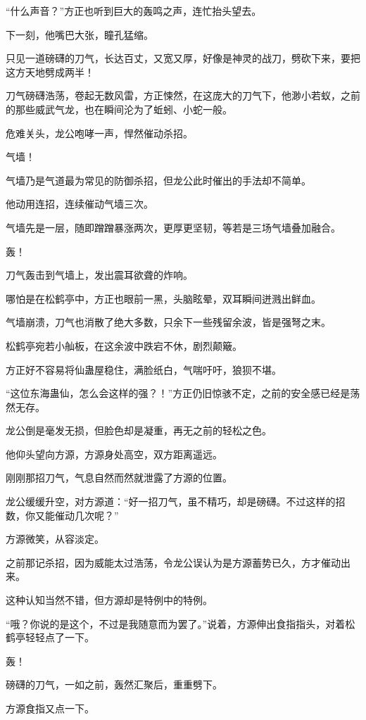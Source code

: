 \begin{this_body}
“什么声音？”方正也听到巨大的轰鸣之声，连忙抬头望去。

下一刻，他嘴巴大张，瞳孔猛缩。

只见一道磅礴的刀气，长达百丈，又宽又厚，好像是神灵的战刀，劈砍下来，要把这方天地劈成两半！

刀气磅礴浩荡，卷起无数风雷，方正悚然，在这庞大的刀气下，他渺小若蚁，之前的那些威武气龙，也在瞬间沦为了蚯蚓、小蛇一般。

危难关头，龙公咆哮一声，悍然催动杀招。

气墙！

气墙乃是气道最为常见的防御杀招，但龙公此时催出的手法却不简单。

他动用连招，连续催动气墙三次。

气墙先是一层，随即蹭蹭暴涨两次，更厚更坚韧，等若是三场气墙叠加融合。

轰！

刀气轰击到气墙上，发出震耳欲聋的炸响。

哪怕是在松鹤亭中，方正也眼前一黑，头脑眩晕，双耳瞬间迸溅出鲜血。

气墙崩溃，刀气也消散了绝大多数，只余下一些残留余波，皆是强弩之末。

松鹤亭宛若小舢板，在这余波中跌宕不休，剧烈颠簸。

方正好不容易将仙蛊屋稳住，满脸纸白，气喘吁吁，狼狈不堪。

“这位东海蛊仙，怎么会这样的强？！”方正仍旧惊骇不定，之前的安全感已经是荡然无存。

龙公倒是毫发无损，但脸色却是凝重，再无之前的轻松之色。

他仰头望向方源，方源身处高空，双方距离遥远。

刚刚那招刀气，气息自然而然就泄露了方源的位置。

龙公缓缓升空，对方源道：“好一招刀气，虽不精巧，却是磅礴。不过这样的招数，你又能催动几次呢？”

方源微笑，从容淡定。

之前那记杀招，因为威能太过浩荡，令龙公误认为是方源蓄势已久，方才催动出来。

这种认知当然不错，但方源却是特例中的特例。

“哦？你说的是这个，不过是我随意而为罢了。”说着，方源伸出食指指头，对着松鹤亭轻轻点了一下。

轰！

磅礴的刀气，一如之前，轰然汇聚后，重重劈下。

方源食指又点一下。


\end{this_body}
